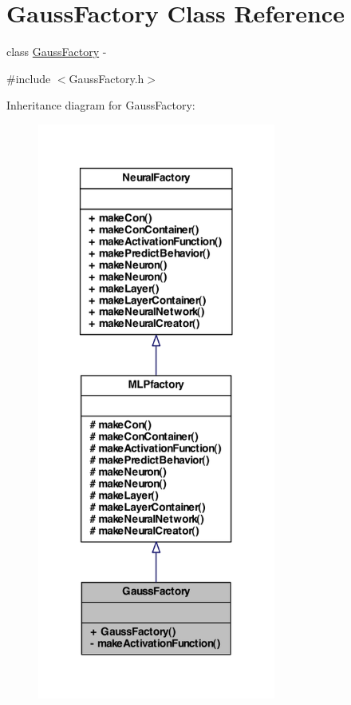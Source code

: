 \hypertarget{class_gauss_factory}{
\section{GaussFactory Class Reference}
\label{class_gauss_factory}
}


class \hyperlink{class_gauss_factory}{GaussFactory} -\/  




{\ttfamily \#include $<$GaussFactory.h$>$}



Inheritance diagram for GaussFactory:\nopagebreak
\begin{figure}[H]
\begin{center}
\leavevmode
\includegraphics[width=222pt]{class_gauss_factory__inherit__graph}
\end{center}
\end{figure}


